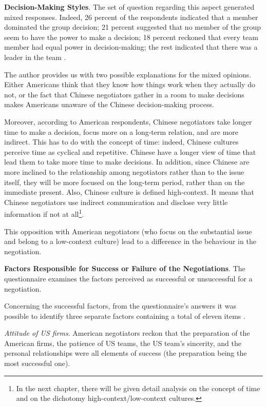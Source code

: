 \documentclass[../main.tex]{subfiles}
\begin{document}
\textbf{Decision-Making Styles}.
The set of question regarding this aspect generated mixed responses. Indeed, 26 percent of the respondents indicated that a member dominated the group decision; 21 percent suggested that no member of the group seem to have the power to make a decision; 18 percent reckoned that every team member had equal power in decision-making; the rest indicated that there was a leader in the team \autocite[63]{tung}.

The author provides us with two possible explanations for the mixed opinions. Either Americans think that they know how things work when they actually do not, or the fact that Chinese negotiators gather in a room to make decisions makes Americans unaware of the Chinese decision-making process.

Moreover, according to American respondents, Chinese negotiators take longer time to make a decision, focus more on a long-term relation, and are more indirect. This has to do with the concept of time: indeed, Chinese cultures perceive time as cyclical and repetitive. Chinese have a longer view of time that lead them to take more time to make decisions. In addition, since Chinese are more inclined to the relationship among negotiators rather than to the issue itself, they will be more focused on the long-term period, rather than on the immediate present. Also, Chinese culture is defined high-context. It means that Chinese negotiators use indirect communication and disclose very little information if not at all\footnote{In the next chapter, there will be given detail analysis on the concept of time and on the dichotomy high-context/low-context cultures.}.

This opposition with American negotiators (who focus on the substantial issue and belong to a low-context culture) lead to a difference in the behaviour in the negotiation.

\textbf{Factors Responsible for Success or Failure of the Negotiations}. The questionnaire examines the factors perceived as successful or unsuccessful for a negotiation.

Concerning the successful factors, from the questionnaire's answers it was possible to identify three separate factors containing a total of eleven items \autocite[66]{tung}.

\textit{Attitude of US firms}. American negotiators reckon that the preparation of the American firms, the patience of US teams, the US team's sincerity, and the personal relationships were all elements of success (the preparation being the most successful one).
\end{document}
